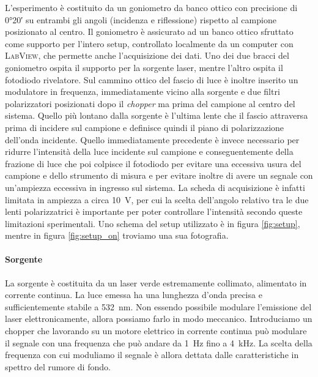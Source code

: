 \documentclass[
    prb,altaffilletter,citeautoscript,
    amsmath,amssymb,
    showpacs,showkeys,floatfix,
    reprint
]{revtex4-1}
\begin{document}
L'esperimento è costituito da un goniometro da banco ottico con precisione di \ang{0;20} su entrambi gli angoli (incidenza e riflessione) rispetto al campione posizionato al centro. Il goniometro è assicurato ad un banco ottico sfruttato come supporto per l'intero setup, controllato localmente da un computer con \textsc{LabView}, che permette anche l'acquisizione dei dati. Uno dei due bracci del goniometro ospita il supporto per la sorgente laser, mentre l'altro ospita il fotodiodo rivelatore. Sul cammino ottico del fascio di luce è inoltre inserito un modulatore in frequenza, immediatamente vicino alla sorgente e due filtri polarizzatori posizionati dopo il \emph{chopper} ma prima del campione al centro del sistema. Quello più lontano dalla sorgente è l'ultima lente che il fascio attraversa prima di incidere sul campione e definisce quindi il piano di polarizzazione dell'onda incidente. Quello immediatamente precedente è invece necessario per ridurre l'intensità della luce incidente sul campione e conseguentemente della frazione di luce che poi colpisce il fotodiodo per evitare una eccessiva usura del campione e dello strumento di misura e per evitare inoltre di avere un segnale con un'ampiezza eccessiva in ingresso sul sistema. La scheda di acquisizione è infatti limitata in ampiezza a circa \SI{10}{\volt}, per cui la scelta dell'angolo relativo tra le due lenti polarizzatrici è importante per poter controllare l'intensità secondo queste limitazioni sperimentali. Uno schema del setup utilizzato è in figura \ref{fig:setup}, mentre in figura \ref{fig:setup_on} troviamo una sua fotografia. 

\paragraph*{Sorgente} La sorgente è costituita da un laser verde estremamente collimato, alimentato in corrente continua. La luce emessa ha una lunghezza d'onda precisa e sufficientemente stabile a \SI{532}{\nano\metre}. Non essendo possibile modulare l'emissione del laser elettronicamente, allora possiamo farlo in modo meccanico. Introduciamo un chopper che lavorando su un motore elettrico in corrente continua può modulare il segnale con una frequenza che può andare da \SI{1}{\hertz} fino a \SI{4}{\kilo\hertz}. La scelta della frequenza con cui moduliamo il segnale è allora dettata dalle caratteristiche in spettro del rumore di fondo. 
\end{document}

